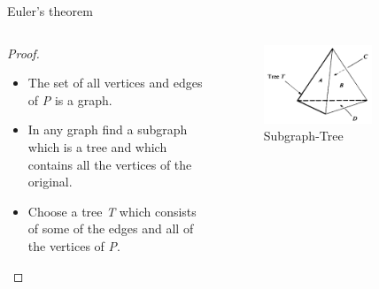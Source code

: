 \documentclass{beamer}
\begin{document}
\begin{frame}{Euler's theorem}
  \begin{columns}
    \begin{column}{0.5\textwidth}
      \begin{proof}
        \begin{itemize}
        \item The set of all vertices and edges of \textsl{P} is a graph.
        \item In any graph find a subgraph which is a tree and which contains all the vertices of the original.
        \item Choose a tree \textsl{T} which consists of some of the edges and all of the vertices of \textsl{P}.
        \end{itemize}
      \end{proof}
    \end{column}
    \begin{column}{0.5\textwidth}
      \begin{figure}
        \centering
        \includegraphics[width=0.7\textwidth]{figure_1_5_a.png}
        \caption{Subgraph-Tree}
      \end{figure}
    \end{column}
  \end{columns}
\end{frame}
\end{document}
